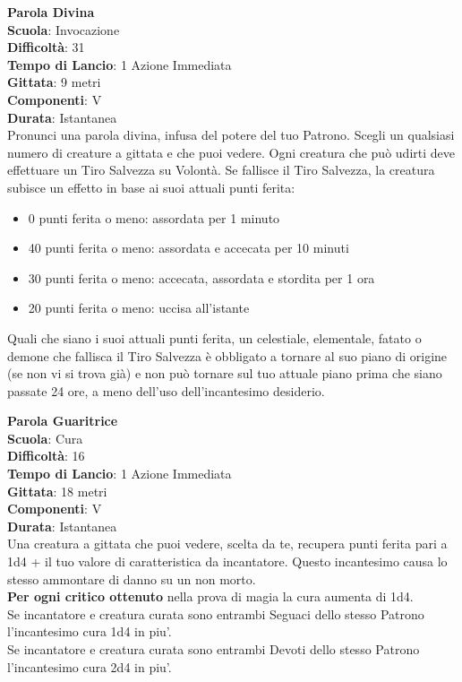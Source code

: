 \begin{multicols}{2}
\medskip\textbf{Parola Divina}\\
\textbf{Scuola}: Invocazione\\
\textbf{Difficoltà}: 31\\
\textbf{Tempo di Lancio}: 1 Azione Immediata\\
\textbf{Gittata}: 9 metri\\
\textbf{Componenti}: V\\
\textbf{Durata}: Istantanea\\
Pronunci una parola divina, infusa del potere del tuo Patrono. Scegli un qualsiasi numero di creature a gittata e che puoi vedere. Ogni creatura che può udirti deve effettuare un Tiro Salvezza su Volontà. Se fallisce il Tiro Salvezza, la creatura subisce un effetto in base ai suoi attuali punti ferita:
\medskip
\begin{itemize}
\item	
0 punti ferita o meno: assordata per 1 minuto
\item	
40 punti ferita o meno: assordata e accecata per 10 minuti
\item	
30 punti ferita o meno: accecata, assordata e stordita per 1 ora
\item	
20 punti ferita o meno: uccisa all'istante
\end{itemize}
\medskip
Quali che siano i suoi attuali punti ferita, un celestiale, elementale, fatato o demone che fallisca il Tiro Salvezza è obbligato a tornare al suo piano di origine (se non vi si trova già) e non può tornare sul tuo attuale piano prima che siano passate 24 ore, a meno dell'uso dell'incantesimo desiderio.

\medskip\textbf{Parola Guaritrice}\\
\textbf{Scuola}: Cura\\
\textbf{Difficoltà}: 16\\
\textbf{Tempo di Lancio}: 1 Azione Immediata\\
\textbf{Gittata}: 18 metri\\
\textbf{Componenti}: V\\
\textbf{Durata}: Istantanea\\
Una creatura a gittata che puoi vedere, scelta da te, recupera punti ferita pari a 1d4 + il tuo valore di caratteristica da incantatore. Questo incantesimo causa lo stesso ammontare di danno su un non morto.\\
\textbf{Per ogni critico ottenuto} nella prova di magia la cura aumenta di 1d4.\\
Se incantatore e creatura curata sono entrambi Seguaci dello stesso Patrono l'incantesimo cura 1d4 in piu'.\\
Se incantatore e creatura curata sono entrambi Devoti dello stesso Patrono l'incantesimo cura 2d4 in piu'.\\


\end{multicols}

